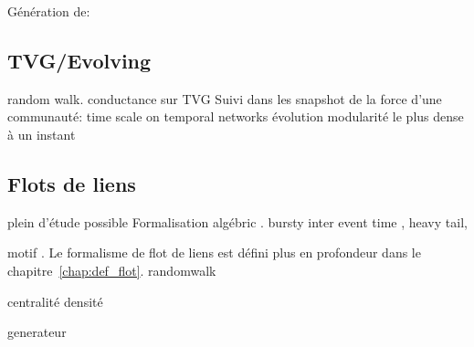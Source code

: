 Génération de: \cite{Granell2015, Karsai2014,Perra2012}

\subsection{TVG/Evolving}
\cite{Casteigts2011,Wehmuth2014}
\cite{Figueiredo2012} random walk.
\cite{Cazabet2010} conductance sur TVG
Suivi dans les snapshot de la force d'une communauté: \cite{Du2015}
\cite{Caceres2013} time scale on temporal networks 
\cite{Cordeiro2016} évolution modularité
\cite{Epasto2015} le plus dense à un instant
\cite{Sun2014}

\subsection{Flots de liens}
\cite{Holme2013a,Holme2015b,Holme2015} plein d'étude possible
Formalisation algébric \cite{Batagelj2015}.
bursty \cite{Karsai2012a,Karsai2011,Moinet2015,Stehle2010} inter event time \cite{Kivela2014a}, \cite{Malmgren2008,Malmgren2009} heavy tail, \cite{Rocha2013}

motif \cite{Kovanen2011a,Kovanen2013}.
Le formalisme de flot de liens est défini plus en profondeur dans le chapitre~\ref{chap:def_flot}.
randomwalk\cite{Starnini2012b}

\cite{Gaumont2016}
centralité \cite{Costa2015,Kim2012, Pfitzner2013a, Praprotnik2015,Scholtes2015,Takaguchi2016}
densité \cite{Viard2014a}

generateur \cite{Starnini2013,Vestergaard2014}